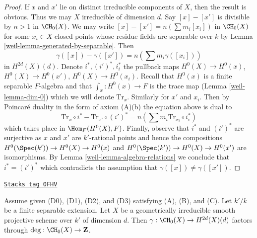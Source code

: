 \begin{proof}

If $x$ and $x'$ lie on distinct irreducible components of $X$, then
the result is obvious. Thus we may $X$ irreducible of dimension $d$.
Say $[x] - [x']$ is divisible by $n > 1$ in $\CH_0(X)$.
We may write $[x] - [x'] = n(\sum m_i [x_i])$ in $\CH_0(X)$
for some $x_i \in X$ closed points
whose residue fields are separable over $k$ by
Lemma \ref{weil-lemma-generated-by-separable}.
Then
$$
\gamma([x]) - \gamma([x']) = n (\sum m_i \gamma([x_i]))
$$
in $H^{2d}(X)(d)$. Denote $i^*, (i')^*, i_i^*$ the pullback maps
$H^0(X) \to H^0(x)$, $H^0(X) \to H^0(x')$, $H^0(X) \to H^0(x_i)$.
Recall that $H^0(x)$ is a finite separable $F$-algebra
and that $\int_x : H^0(x) \to F$ is the trace map
(Lemma \ref{weil-lemma-dim-0}) which we will denote $\text{Tr}_x$.
Similarly for $x'$ and $x_i$. Then by Poincar\'e duality in the form of
axiom (A)(b) the equation above is dual to
$$
\text{Tr}_x \circ i^* - \text{Tr}_{x'} \circ (i')^* =
n(\sum m_i \text{Tr}_{x_i} \circ i_i^*)
$$
which takes place in $\Hom_F(H^0(X), F)$. Finally, observe that
$i^*$ and $(i')^*$ are surjective as $x$ and $x'$ are $k'$-rational
points and hence the compositions $H^0(\Spec(k')) \to H^0(X) \to H^0(x)$
and $H^0(\Spec(k')) \to H^0(X) \to H^0(x')$ are isomorphisms.
By Lemma \ref{weil-lemma-algebra-relations} we conclude that $i^* = (i')^*$
which contradicts the assumption that $\gamma([x]) \not = \gamma([x'])$.
\end{proof}

\begin{lemma}
\label{weil-lemma-classes-points}
\href{https://stacks.math.columbia.edu/tag/0FHV}{\texttt{Stacks tag 0FHV}}

Assume given (D0), (D1), (D2), and (D3) satisfying (A), (B), and (C).
Let $k'/k$ be a finite separable extension. Let $X$ be a geometrically
irreducible smooth projective scheme over $k'$ of dimension $d$.
Then $\gamma : \CH_0(X) \to H^{2d}(X)(d)$ factors through
$\deg : \CH_0(X) \to \mathbf{Z}$.
\end{lemma}

